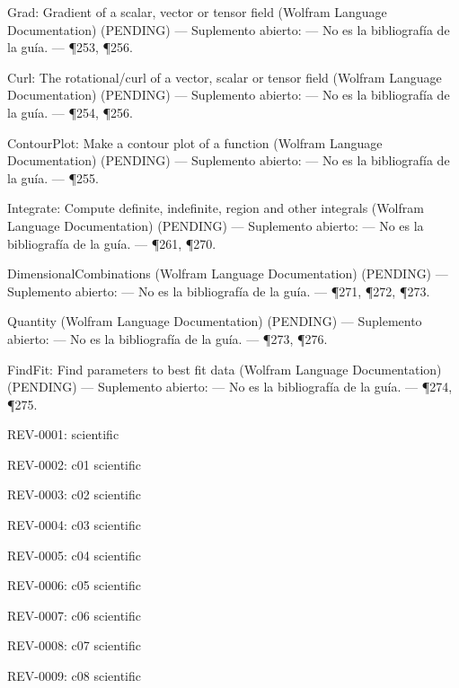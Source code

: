 \documentclass[10pt,openany]{book}
\begin{document}
\noindent Grad: Gradient of a scalar, vector or tensor field (Wolfram Language Documentation) (PENDING) --- Suplemento abierto: --- No es la bibliografía de la guía. --- \P253, \P256.\par
\noindent Curl: The rotational/curl of a vector, scalar or tensor field (Wolfram Language Documentation) (PENDING) --- Suplemento abierto: --- No es la bibliografía de la guía. --- \P254, \P256.\par
\noindent ContourPlot: Make a contour plot of a function (Wolfram Language Documentation) (PENDING) --- Suplemento abierto: --- No es la bibliografía de la guía. --- \P255.\par
\noindent Integrate: Compute definite, indefinite, region and other integrals (Wolfram Language Documentation) (PENDING) --- Suplemento abierto: --- No es la bibliografía de la guía. --- \P261, \P270.\par
\noindent DimensionalCombinations (Wolfram Language Documentation) (PENDING) --- Suplemento abierto: --- No es la bibliografía de la guía. --- \P271, \P272, \P273.\par
\noindent Quantity (Wolfram Language Documentation) (PENDING) --- Suplemento abierto: --- No es la bibliografía de la guía. --- \P273, \P276.\par
\noindent FindFit: Find parameters to best fit data (Wolfram Language Documentation) (PENDING) --- Suplemento abierto: --- No es la bibliografía de la guía. --- \P274, \P275.\par

\noindent REV-0001:  scientific\par

\noindent REV-0002: c01 scientific\par

\noindent REV-0003: c02 scientific\par

\noindent REV-0004: c03 scientific\par

\noindent REV-0005: c04 scientific\par

\noindent REV-0006: c05 scientific\par

\noindent REV-0007: c06 scientific\par

\noindent REV-0008: c07 scientific\par

\noindent REV-0009: c08 scientific\par
\end{document}
